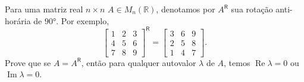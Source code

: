 Para uma matriz real \(n \times n\) \(A \in M_n(\mathbb{R})\), denotamos por \(A^{\mathsf{R}}\) sua rotação anti-horária de \(90°\). Por exemplo,
\[
\begin{bmatrix} 1 & 2 & 3 \\ 4 & 5 & 6 \\ 7 & 8 & 9 \end{bmatrix}^{\mathsf{R}} = \begin{bmatrix} 3 & 6 & 9 \\ 2 & 5 & 8 \\ 1 & 4 & 7 \end{bmatrix}.
\]
Prove que se \(A = A^{\mathsf{R}}\), então para qualquer autovalor \(\lambda\) de \(A\), temos \(\operatorname{Re} \lambda = 0\) ou \(\operatorname{Im} \lambda = 0\).
